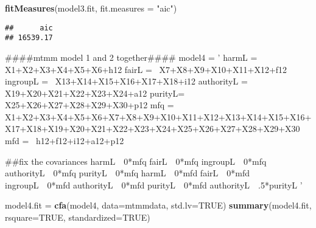 \documentclass[english,man]{apa6}
\newenvironment{Shaded}{\begin{snugshade}}{\end{snugshade}}
\newcommand{\KeywordTok}[1]{\textcolor[rgb]{0.13,0.29,0.53}{\textbf{#1}}}
\newcommand{\DataTypeTok}[1]{\textcolor[rgb]{0.13,0.29,0.53}{#1}}
\newcommand{\StringTok}[1]{\textcolor[rgb]{0.31,0.60,0.02}{#1}}
\newcommand{\OtherTok}[1]{\textcolor[rgb]{0.56,0.35,0.01}{#1}}
\newcommand{\NormalTok}[1]{#1}
\newcounter{author}
\theoremstyle{definition}
\theoremstyle{definition}
\theoremstyle{definition}
\theoremstyle{remark}
\begin{document}
\begin{Shaded}
\begin{Highlighting}[]
\KeywordTok{fitMeasures}\NormalTok{(model3.fit, }\DataTypeTok{fit.measures =} \StringTok{"aic"}\NormalTok{)}
\end{Highlighting}
\end{Shaded}

\begin{verbatim}
##      aic 
## 16539.17
\end{verbatim}

\begin{Shaded}
\begin{Highlighting}[]
\NormalTok{####mtmm model 1 and 2 together####}
\NormalTok{model4 =}\StringTok{ '}
\StringTok{harmL =~ X1+X2+X3+X4+X5+X6+h12}
\StringTok{fairL =~ X7+X8+X9+X10+X11+X12+f12}
\StringTok{ingroupL =~ X13+X14+X15+X16+X17+X18+i12}
\StringTok{authorityL =~ X19+X20+X21+X22+X23+X24+a12}
\StringTok{purityL=~ X25+X26+X27+X28+X29+X30+p12}
\StringTok{mfq =~ X1+X2+X3+X4+X5+X6+X7+X8+X9+X10+X11+X12+X13+X14+X15+X16+X17+X18+X19+X20+X21+X22+X23+X24+X25+X26+X27+X28+X29+X30}
\StringTok{mfd =~ h12+f12+i12+a12+p12}

\StringTok{##fix the covariances}
\StringTok{harmL~~0*mfq}
\StringTok{fairL~~0*mfq}
\StringTok{ingroupL~~0*mfq}
\StringTok{authorityL~~0*mfq}
\StringTok{purityL~~0*mfq}
\StringTok{harmL~~0*mfd}
\StringTok{fairL~~0*mfd}
\StringTok{ingroupL~~0*mfd}
\StringTok{authorityL~~0*mfd}
\StringTok{purityL~~0*mfd}
\StringTok{authorityL~~.5*purityL}
\StringTok{'}

\NormalTok{model4.fit =}\StringTok{ }\KeywordTok{cfa}\NormalTok{(model4, }\DataTypeTok{data=}\NormalTok{mtmmdata, }\DataTypeTok{std.lv=}\OtherTok{TRUE}\NormalTok{)}
\KeywordTok{summary}\NormalTok{(model4.fit, }\DataTypeTok{rsquare=}\OtherTok{TRUE}\NormalTok{, }\DataTypeTok{standardized=}\OtherTok{TRUE}\NormalTok{)}
\end{Highlighting}
\end{Shaded}
\end{document}
